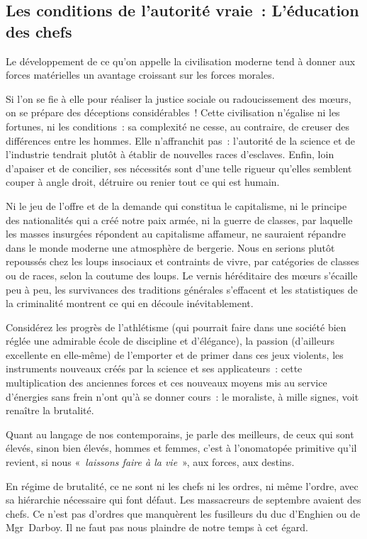 \documentclass[french,twoside]{book} %
\begin{document}
\subsection[Les conditions de l’autorité vraie : L’éducation des chefs]{Les conditions de l’autorité vraie : L’éducation des chefs}
\noindent Le développement de ce qu’on appelle la civilisation moderne tend à donner aux forces matérielles un avantage croissant sur les forces morales.\par
Si l’on se fie à elle pour réaliser la justice sociale ou radoucissement des mœurs, on se prépare des déceptions considérables ! Cette civilisation n’égalise ni les fortunes, ni les conditions : sa complexité ne cesse, au contraire, de creuser des différences entre les hommes. Elle n’affranchit pas : l’autorité de la science et de l’industrie tendrait plutôt à établir de nouvelles races d’esclaves. Enfin, loin d’apaiser et de concilier, ses nécessités sont d’une telle rigueur qu’elles semblent couper à angle droit, détruire ou renier tout ce qui est humain.\par
Ni le jeu de l’offre et de la demande qui constitua le capitalisme, ni le principe des nationalités qui a créé notre paix armée, ni la guerre de classes, par laquelle les masses insurgées répondent au capitalisme affameur, ne sauraient répandre dans le monde moderne une atmosphère de bergerie. Nous en serions plutôt repoussés chez les loups insociaux et contraints de vivre, par catégories de classes ou de races, selon la coutume des loups. Le vernis héréditaire des mœurs s’écaille peu à peu, les survivances des traditions générales s’effacent et les statistiques de la criminalité montrent ce qui en découle inévitablement.\par
Considérez les progrès de l’athlétisme (qui pourrait faire dans une société bien réglée une admirable école de discipline et d’élégance), la passion (d’ailleurs excellente en elle-même) de l’emporter et de primer dans ces jeux violents, les instruments nouveaux créés par la science et ses applicateurs : cette multiplication des anciennes forces et ces nouveaux moyens mis au service d’énergies sans frein n’ont qu’à se donner cours : le moraliste, à mille signes, voit renaître la brutalité.\par
Quant au langage de nos contemporains, je parle des meilleurs, de ceux qui sont élevés, sinon bien élevés, hommes et femmes, c’est à l’onomatopée primitive qu’il revient, si nous «\emph{ laissons faire à la vie} », aux forces, aux destins.\par
En régime de brutalité, ce ne sont ni les chefs ni les ordres, ni même l’ordre, avec sa hiérarchie nécessaire qui font défaut. Les massacreurs de septembre avaient des chefs. Ce n’est pas d’ordres que manquèrent les fusilleurs du duc d’Enghien ou de Mgr Darboy. Il ne faut pas nous plaindre de notre temps à cet égard.\par
\end{document}
